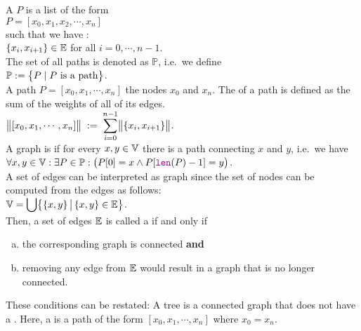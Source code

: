 \noindent
A  $P$ is a list of the form 
\\[0.2cm]
\hspace*{1.3cm} 
$P = [ x_0, x_1, x_2, \cdots, x_n ]$ 
\\[0.2cm]
such that we have : \\[0.2cm]
\hspace*{1.3cm}
$\{x_i,x_{i+1}\} \in {\mathbb E}$  \quad for all $i = 0, \cdots, n-1$.
\\[0.2cm]
The set of all paths is denoted as $\mathbb{P}$, i.e.~we define
\\[0.2cm]
\hspace*{1.3cm}
$\displaystyle \mathbb{P}  := \bigl\{ P \mid \mbox{$P$ is a path} \bigr\}$.
\\[0.2cm]
A path $P = [ x_0, x_1, \cdots, x_n]$  the nodes $x_0$ and $x_n$.  The  of a
path is defined as
the sum of the weights of all of its edges.  
\\[0.2cm]
\hspace*{1.3cm}
 $\displaystyle\bigl\|[x_0,x_1, \cdots, x_n]\bigr\| \;:=\; \sum\limits_{i=0}^{n-1} \bigl\|\{x_i,x_{i+1}\}\bigr\|$. 
\\[0.2cm]
A graph is  if for every $x,y \in {\mathbb V}$ there is a path connecting $x$ and $y$, i.e.~we have
\\[0.2cm]
\hspace*{1.3cm}
$\forall x, y \in \mathbb{V}: \exists P \in \mathbb{P}: \bigl(P[0] = x \wedge P[\mytt{len}(P)-1] = y\bigr)$.
\\[0.2cm]
A set of edges can be interpreted as graph since the set of nodes can be computed from the edges as
follows: 
\\[0.2cm]
\hspace*{1.3cm}
$\displaystyle{\mathbb V} = \bigcup \bigl\{\{x,y\} \,\big|\, \{x,y\} \in {\mathbb E} \bigr\}$.
\\[0.2cm]
Then, a set of edges ${\mathbb E}$ is called a  if and only if
\begin{enumerate}[(a)]
\item the corresponding graph is connected \quad \textbf{and}
\item removing any edge from ${\mathbb E}$ would result in a graph that is no longer connected.
\end{enumerate}
These conditions can be restated: A tree is a connected graph that does not have a .
Here, a  is a path of the form $[x_0, x_1, \cdots, x_n]$ where $x_0 = x_n$.  


